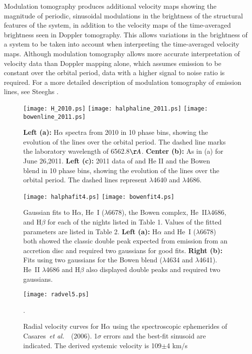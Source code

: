 \documentclass{aa}
\def\etal{{\em et al.}\ }
\begin{document}
Modulation tomography produces additional velocity maps showing the magnitude of periodic, sinusoidal modulations in the brightness of the structural features of the system, in addition to the velocity maps of the time-averaged brightness seen in Doppler tomography. This allows variations in the brightness of a system to be taken into account when interpreting the time-averaged velocity maps. Although modulation tomography allows more accurate interpretation of velocity data than Doppler mapping alone, which assumes emission to be constant over the orbital period, data with a higher signal to noise ratio is required. 
For a more detailed description of modulation tomography of emission lines, see Steeghs \cite{steeghs}.

\begin{figure*}
\texttt{[image: H\_2010.ps]}
\texttt{[image: halphaline\_2011.ps]}
\texttt{[image: bowenline\_2011.ps]}
\hspace{0.7cm}
\caption{{\bf Left (a):} H$\alpha$ spectra from 2010 in 10 phase bins, showing the
evolution of the lines over the orbital period. The dashed line marks
the laboratory wavelength of 6562.8$\AA$.
{\bf Center (b):} As in (a) for June 26,2011.
{\bf Left (c):} 2011 data of and He II and the Bowen blend in 10 phase bins, showing the
evolution of the lines over the orbital period. The dashed lines represent
$\lambda$4640 and $\lambda$4686.} 
\label{phasecur}
\end{figure*}


\begin{figure*}
\texttt{[image: halphafit4.ps]}
 \texttt{[image: bowenfit4.ps]}
 \hspace{0.7cm}
 \caption{Gaussian fits to H$\alpha$, He~I ($\lambda$6678), 
the Bowen complex, He~II$\lambda$4686, and H$\beta$ for each of the
nights 
listed in Table 1. Values of the fitted parameters are listed in Table 2. 
{\bf Left (a):} H$\alpha$ and He~I ($\lambda$6678) both showed the classic
double peak expected from emission from an accretion disc and required two 
gaussians for good fits.
{\bf Right (b):}
Fits using two gaussians for the Bowen blend ($\lambda$4634 and
$\lambda$4641). He~II $\lambda$4686 and H$\beta$ also displayed 
double peaks and required two
gaussians.}
\label{fit1}
\end{figure*}

\begin{figure}
\texttt{[image: radvel5.ps]}
 \hspace{0.7cm}
\caption{Radial velocity curves for H$\alpha$ using the spectroscopic
ephemerides of Casares~\etal~(2006). 1$\sigma$ errors and the best-fit sinusoid are indicated.
The derived systemic velocity is 109$\pm$4 km/s}.
\label{radvel}
\end{figure}
\end{document}
